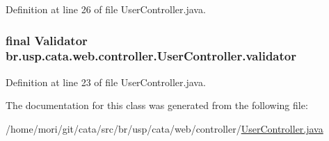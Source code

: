 Definition at line 26 of file User\+Controller.\+java.

\hypertarget{classbr_1_1usp_1_1cata_1_1web_1_1controller_1_1_user_controller_a230e834923156fb513f39dcd58c8c41b}{
\subsubsection[{validator}]{\setlength{\rightskip}{0pt plus 5cm}final Validator br.\+usp.\+cata.\+web.\+controller.\+User\+Controller.\+validator\hspace{0.3cm}{\ttfamily [private]}}}\label{classbr_1_1usp_1_1cata_1_1web_1_1controller_1_1_user_controller_a230e834923156fb513f39dcd58c8c41b}


Definition at line 23 of file User\+Controller.\+java.



The documentation for this class was generated from the following file\+:\begin{DoxyCompactItemize}
\item 
/home/mori/git/cata/src/br/usp/cata/web/controller/\hyperlink{_user_controller_8java}{User\+Controller.\+java}\end{DoxyCompactItemize}
